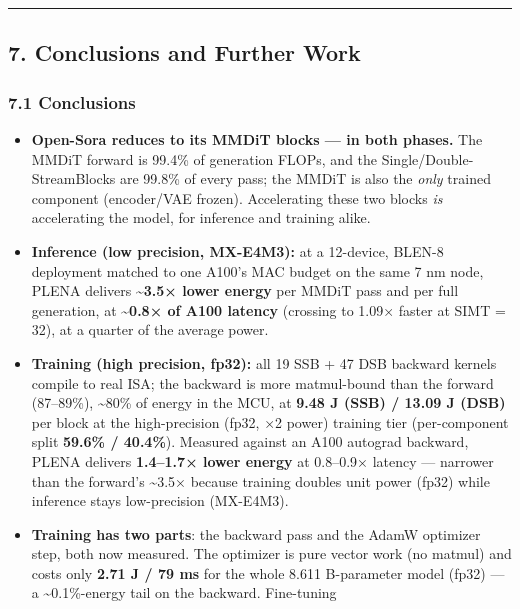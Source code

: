\documentclass[
  10pt,
]{article}
\providecommand{\tightlist}{%
  \setlength{\itemsep}{0pt}\setlength{\parskip}{0pt}}
\begin{document}
\begin{center}\rule{0.5\linewidth}{0.5pt}\end{center}

\subsection{7. Conclusions and Further Work}\label{conclusions-and-further-work}

\subsubsection{7.1 Conclusions}\label{conclusions}

\begin{itemize}
\tightlist
\item
  \textbf{Open-Sora reduces to its MMDiT blocks --- in both phases.} The
  MMDiT forward is 99.4\% of generation FLOPs, and the
  Single/Double-StreamBlocks are 99.8\% of every pass; the MMDiT is also
  the \emph{only} trained component (encoder/VAE frozen). Accelerating
  these two blocks \emph{is} accelerating the model, for inference and
  training alike.
\item
  \textbf{Inference (low precision, MX-E4M3):} at a 12-device, BLEN-8
  deployment matched to one A100's MAC budget on the same 7 nm node,
  PLENA delivers \textbf{\textasciitilde3.5× lower energy} per MMDiT pass
  and per full generation, at \textbf{\textasciitilde0.8× of A100
  latency} (crossing to 1.09× faster at SIMT = 32), at a quarter of the
  average power.
\item
  \textbf{Training (high precision, fp32):} all 19 SSB + 47 DSB backward
  kernels compile to real ISA; the backward is more matmul-bound than the
  forward (87--89\%), \textasciitilde80\% of energy in the MCU, at
  \textbf{9.48 J (SSB) / 13.09 J (DSB)} per block at the high-precision
  (fp32, ×2 power) training tier (per-component split \textbf{59.6\% /
  40.4\%}). Measured against an A100 autograd backward, PLENA delivers
  \textbf{1.4--1.7× lower energy} at 0.8--0.9× latency --- narrower than
  the forward's \textasciitilde3.5× because training doubles unit power
  (fp32) while inference stays low-precision (MX-E4M3).
\item
  \textbf{Training has two parts}: the backward pass and the AdamW
  optimizer step, both now measured. The optimizer is pure vector work
  (no matmul) and costs only \textbf{2.71 J / 79 ms} for the whole 8.611
  B-parameter model
  (fp32) --- a \textasciitilde0.1\%-energy tail on the backward. Fine-tuning

\end{itemize}
\end{document}
